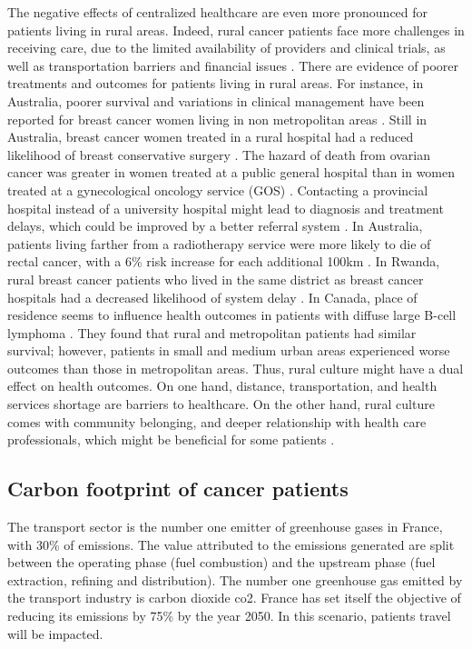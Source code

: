 The negative effects of centralized healthcare are even more pronounced for patients living in rural areas. Indeed, rural cancer patients face more challenges in receiving care, due to the limited availability of providers and clinical trials, as well as transportation barriers and financial issues \cite{charlton_challenges_2015}. There are evidence of poorer treatments and outcomes for patients living in rural areas. For instance, in Australia, poorer survival and variations in clinical management have been reported for breast cancer women living in non metropolitan areas \cite{dasgupta_variations_2018}. Still in Australia, breast cancer women treated in a rural hospital had a reduced likelihood of breast conservative surgery \cite{hall_unequal_2004}.  The hazard of death from ovarian cancer was greater in women treated at a public general hospital than in women treated at a gynecological oncology service (GOS) \cite{tracey_effects_2014}. Contacting a provincial hospital instead of a university hospital might lead to diagnosis and treatment delays, which could be improved by a better referral system \cite{thongsuksai_delay_2000}. In Australia, patients living farther from a radiotherapy service were more likely to die of rectal cancer, with a 6\% risk increase for each additional 100km \cite{baade_distance_2011}. In Rwanda, rural breast cancer patients who lived in the same district as breast cancer hospitals had a decreased likelihood of system delay \cite{pace_delays_2015}. In Canada, place of residence seems to influence health outcomes in patients with diffuse large B-cell lymphoma \cite{lee_effect_2014}. They found that rural and metropolitan patients had similar survival; however, patients in small and medium urban areas experienced worse outcomes than those in metropolitan areas. Thus, rural culture might have a dual effect on health outcomes. On one hand, distance, transportation, and health services shortage are barriers to healthcare. On the other hand, rural culture comes with community belonging, and deeper relationship with health care professionals, which might be beneficial for some patients \cite{brundisini_chronic_2013}.

\subsection{Carbon footprint of cancer patients}

The transport sector is the number one emitter of greenhouse gases in France, with 30\% of emissions. The value attributed to the emissions generated are split between the operating phase (fuel combustion) and the upstream phase (fuel extraction, refining and distribution). The number one greenhouse gas emitted by the transport industry is carbon dioxide \ac{co2}.
France has set itself the objective of reducing its emissions by 75\% by the year 2050. In this scenario, patients travel will be impacted.

